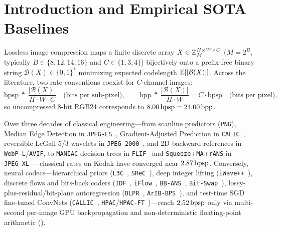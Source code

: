 \section{Introduction and Empirical SOTA Baselines}
\label{sec:intro}

Lossless image compression maps a finite discrete array $X \in \mathbb{Z}_M^{H \times W \times C}$ ($M = 2^B$, typically $B \in \{8,12,14,16\}$ and $C \in \{1,3,4\}$) bijectively onto a prefix-free binary string $\mathcal{B}(X) \in \{0,1\}^*$ minimizing expected codelength $\mathbb{E}[|\mathcal{B}(X)|]$. Across the literature, two rate conventions coexist for $C$-channel images:
\begin{equation}
  \mathrm{bpsp} \triangleq \frac{|\mathcal{B}(X)|}{H \cdot W \cdot C} \quad \text{(bits per sub-pixel)}, \qquad
  \mathrm{bpp} \triangleq \frac{|\mathcal{B}(X)|}{H \cdot W} = C \cdot \mathrm{bpsp} \quad \text{(bits per pixel)},
\end{equation}
so uncompressed 8-bit RGB24 corresponds to $8.00\,\mathrm{bpsp} = 24.00\,\mathrm{bpp}$.

Over three decades of classical engineering---from scanline predictors (\texttt{PNG}), Median Edge Detection in \texttt{JPEG-LS}~\citep{weinberger2000jpegls}, Gradient-Adjusted Prediction in \texttt{CALIC}~\citep{wu1997calic}, reversible LeGall 5/3 wavelets in \texttt{JPEG~2000}~\citep{taubman2002jpeg2000}, and 2D backward references in \texttt{WebP-L}/\texttt{AVIF}, to \texttt{MANIAC} decision trees in \texttt{FLIF}~\citep{sneyers2016flif} and \texttt{Squeeze}+\texttt{MA}+\texttt{rANS} in \texttt{JPEG~XL}~\citep{alakuijala2019jpegxl,duda2013rans}---classical rates on Kodak have converged near $2.87\,\mathrm{bpsp}$. Conversely, neural codecs---hierarchical priors (\texttt{L3C}~\citep{mentzer2019l3c}, \texttt{SReC}~\citep{cao2020srec}), deep integer lifting (\texttt{iWave++}~\citep{ma2020iwave}), discrete flows and bits-back coders (\texttt{IDF}~\citep{hoogeboom2019idf}, \texttt{iFlow}~\citep{zhang2021iflow}, \texttt{BB-ANS}~\citep{townsend2019bbans}, \texttt{Bit-Swap}~\citep{kingma2019bitswap}), lossy-plus-residual/bit-plane autoregression (\texttt{DLPR}~\citep{bai2024dlpr}, \texttt{ArIB-BPS}~\citep{zhang2024arib}), and test-time SGD fine-tuned ConvNets (\texttt{CALLIC}~\citep{callic2025}, \texttt{HPAC}/\texttt{HPAC-FT}~\citep{hpac2025})---reach $2.52\,\mathrm{bpsp}$ only via multi-second per-image GPU backpropagation and non-deterministic floating-point arithmetic ().

